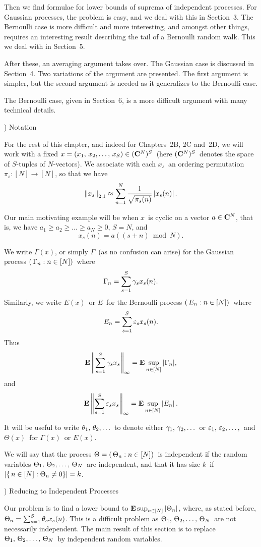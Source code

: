 Then we find formulae for lower bounds of suprema of
independent processes.
For Gaussian processes, the problem
is easy, and we deal with this in Section~3. The Bernoulli
case is more difficult and more interesting, and amongst other
things, requires an interesting result describing the tail of a Bernoulli
random walk.
This we deal with in Section~5.
 
After these, an averaging argument takes over. The Gaussian case
is discussed in Section~4. Two variations of the argument are
presented. The first argument is simpler, but
the second argument is needed as it generalizes to the Bernoulli
case.
 
The Bernoulli case, given in Section~6, is a more difficult argument
with many technical details.
 
) Notation
 
For the rest of this chapter, and indeed for Chapters~2B, 2C and~2D,
we will work with a fixed $x=(\xS)\in \CNS$\ (here $({\bf C}^N)^S$\ denotes
the space of
$S$-tuples of $N$-vectors). We associate with each $x_s$\ an
ordering permutation $\pi_s\colon[N]\to[N]$,
so that we have
$$ \left\| x_s \right\|_{2,1} \approx \sum_{n=1}^N {1\over \sqrt{\pi_s(n)}}
   \left| x_s(n)\right| .$$
 
Our main motivating example will be when $x$\ is {\dt cyclic} on
a vector
$a\in{\bf C}^N$, that is, we have $a_1\ge a_2\ge\ldots\ge a_N\ge0$, $S=N$,
and
$$ x_s(n) = a((s+n)\bmod N) .$$
 
We write $\Gamma(x)$, or simply $\Gamma$\ (as no confusion can
arise) for the Gaussian process $(\,\Gamma_n:n\in[N])$\ where
$$ \Gamma_n = \sum_{s=1}^S \gamma_s x_s(n).$$
Similarly, we write $E(x)$\ or $E$\ for the Bernoulli process
$(\,E_n:n\in[N])$\ where
$$ E_n = \sum_{s=1}^S \varepsilon_s x_s(n).$$
Thus
$$ {\bf E} \left\| \sum_{s=1}^S \gamma_s x_s \right\|_\infty = {\bf E} \sup_{n\in[N]} | \Gamma_n |, $$
and
$$ {\bf E} \left\| \sum_{s=1}^S \varepsilon_s x_s \right\|_\infty = {\bf E} \sup_{n\in[N]} \left| E_n \right| .$$
 
It will be useful to write $\thetalist$\ to denote either
$\gammalist$\ or $\epsilonlist,$\ and $\Theta(x)$\ for
$\Gamma(x)$\ or $E(x)$.
 
We will say that the process $\Theta=(\,\Theta_n:n\in[N])$\ is {\dt independent}
if the random variables $\ThetaN$\ are independent, and that it has
{\dt size $k$}\ if $\left|\{\,n\in[N]:\Theta_n\ne 0\}\right| = k$.
 
) Reducing to Independent Processes
 
Our problem is to find a lower bound to ${\bf E} \sup_{n\in[N]} \left| \Theta_n \right|$,
where, as stated before, $\Theta_n = \sum_{s=1}^S \theta_s x_s(n)$.
This is a difficult problem as $\ThetaN$\ are not necessarily independent.
The main result of this section is to replace $\ThetaN$\ by
independent random variables.
 
